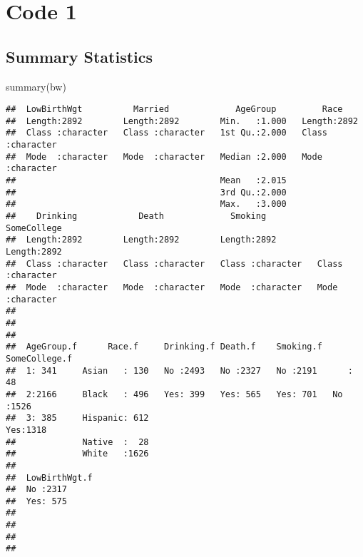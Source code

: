 \documentclass[
]{article}
\newenvironment{Shaded}{\begin{snugshade}}{\end{snugshade}}
\newcommand{\FunctionTok}[1]{\textcolor[rgb]{0.00,0.00,0.00}{#1}}
\newcommand{\NormalTok}[1]{#1}
\begin{document}
\hypertarget{code-1}{%
\section{Code 1}\label{code-1}}

\hypertarget{summary-statistics}{%
\subsection{Summary Statistics}\label{summary-statistics}}

\begin{Shaded}
\begin{Highlighting}[]
\FunctionTok{summary}\NormalTok{(bw)}
\end{Highlighting}
\end{Shaded}

\begin{verbatim}
##  LowBirthWgt          Married             AgeGroup         Race          
##  Length:2892        Length:2892        Min.   :1.000   Length:2892       
##  Class :character   Class :character   1st Qu.:2.000   Class :character  
##  Mode  :character   Mode  :character   Median :2.000   Mode  :character  
##                                        Mean   :2.015                     
##                                        3rd Qu.:2.000                     
##                                        Max.   :3.000                     
##    Drinking            Death             Smoking          SomeCollege       
##  Length:2892        Length:2892        Length:2892        Length:2892       
##  Class :character   Class :character   Class :character   Class :character  
##  Mode  :character   Mode  :character   Mode  :character   Mode  :character  
##                                                                             
##                                                                             
##                                                                             
##  AgeGroup.f      Race.f     Drinking.f Death.f    Smoking.f  SomeCollege.f
##  1: 341     Asian   : 130   No :2493   No :2327   No :2191      :  48     
##  2:2166     Black   : 496   Yes: 399   Yes: 565   Yes: 701   No :1526     
##  3: 385     Hispanic: 612                                    Yes:1318     
##             Native  :  28                                                 
##             White   :1626                                                 
##                                                                           
##  LowBirthWgt.f
##  No :2317     
##  Yes: 575     
##               
##               
##               
## 
\end{verbatim}
\end{document}
